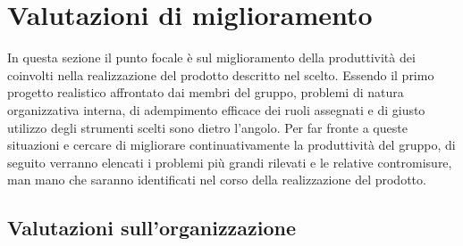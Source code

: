 
\section{Valutazioni di miglioramento}
In questa sezione il punto focale è sul miglioramento della produttività dei  coinvolti nella realizzazione del prodotto descritto nel  scelto. Essendo il primo progetto realistico affrontato dai membri del gruppo, problemi di natura organizzativa interna, di adempimento efficace dei ruoli assegnati e di giusto utilizzo degli strumenti scelti sono dietro l'angolo. Per far fronte a queste situazioni e cercare di migliorare continuativamente la produttività del gruppo, di seguito verranno elencati i problemi più grandi rilevati e le relative contromisure, man mano che saranno identificati nel corso della realizzazione del prodotto.

	\subsection{Valutazioni sull'organizzazione}
  
